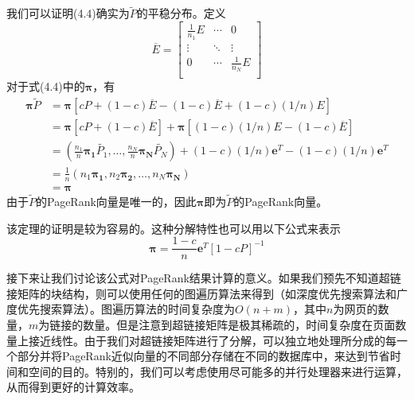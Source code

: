 \documentclass[UTF8,openany]{ctexbook}
\begin{document}
我们可以证明(4.4)确实为$\widetilde{P}$的平稳分布。定义
\begin{equation}
    \overline{E}=\begin{bmatrix}
        \frac{1}{n_1}E & \cdots & 0              \\
        \vdots         & \ddots & \vdots         \\
        0              & \cdots & \frac{1}{n_N}E \\
    \end{bmatrix}
\end{equation}
对于式(4.4)中的$\boldsymbol{\pi}$，有
\begin{equation}
    \begin{aligned}
        \boldsymbol{\pi}\widetilde{P}
         & = \boldsymbol{\pi}\left[cP+(1-c)\overline{E}-(1-c)\overline{E}+(1-c)(1/n)E\right]                                                                                            \\
         & = \boldsymbol{\pi}\left[cP+(1-c)\overline{E}\right]+\boldsymbol{\pi}\left[(1-c)(1/n)E-(1-c)\overline{E}\right]                                                               \\
         & = \left(\frac{n_1}{n}\boldsymbol{\pi_1}\widetilde{P_1},\dots,\frac{n_N}{n}\boldsymbol{\pi_N}\widetilde{P_N}\right)+(1-c)(1/n)\boldsymbol{e}^{T}-(1-c)(1/n)\boldsymbol{e}^{T} \\
         & = \frac{1}{n}\left(n_1\boldsymbol{\pi_1},n_2\boldsymbol{\pi_2},\dots,n_N\boldsymbol{\pi_N}\right)                                                                            \\
         & = \boldsymbol{\pi}
    \end{aligned}
\end{equation}
由于$\widetilde{P}$的PageRank向量是唯一的，因此$\boldsymbol{\pi}$即为$\widetilde{P}$的PageRank向量。

该定理的证明是较为容易的。这种分解特性也可以用以下公式来表示
\begin{equation}
    \boldsymbol{\pi}=\frac{1-c}{n}\boldsymbol{e}^{T}\left[1-cP\right]^{-1}
\end{equation}

接下来让我们讨论该公式对PageRank结果计算的意义。如果我们预先不知道超链接矩阵的块结构，则可以使用任何的图遍历算法来得到（如深度优先搜索算法和广度优先搜索算法）。图遍历算法的时间复杂度为$O(n + m)$，其中$n$为网页的数量，$m$为链接的数量。但是注意到超链接矩阵是极其稀疏的，时间复杂度在页面数量上接近线性。由于我们对超链接矩阵进行了分解，可以独立地处理所分成的每一个部分并将PageRank近似向量的不同部分存储在不同的数据库中，来达到节省时间和空间的目的。特别的，我们可以考虑使用尽可能多的并行处理器来进行运算，从而得到更好的计算效率。
\end{document}
